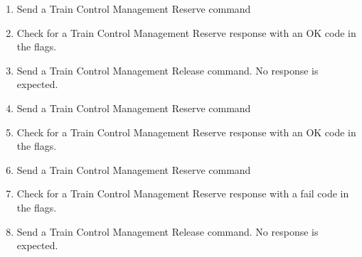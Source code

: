 \begin{enumerate}

    \item Send a Train Control Management Reserve command
    \item Check for a Train Control Management Reserve response with an OK code in the flags.

    \item Send a Train Control Management Release command.  No response is expected.

    \item Send a Train Control Management Reserve command
    \item Check for a Train Control Management Reserve response with an OK code in the flags.

    \item Send a Train Control Management Reserve command
    \item Check for a Train Control Management Reserve response with a fail code in the flags.
    
    \item Send a Train Control Management Release command.  No response is expected.

\end{enumerate}

  
